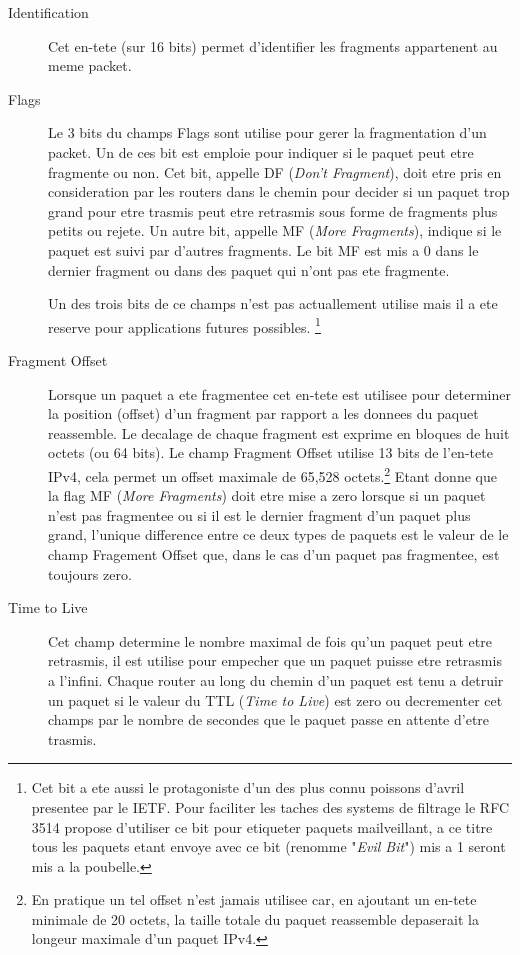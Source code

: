 \documentclass[twoside,openright,a4paper,11pt,french]{article}
\begin{document}
\begin{description}
\item [Identification]
Cet en-tete (sur 16 bits) permet d'identifier les fragments appartenent au meme packet.

\item [Flags]
Le 3 bits du champs Flags sont utilise pour gerer la fragmentation d'un packet.
Un de ces bit est emploie pour indiquer si le paquet peut etre fragmente ou
non. Cet bit, appelle DF ({\it Don't Fragment}), doit etre pris en consideration
par les routers dans le chemin pour decider si un paquet trop grand pour etre
trasmis peut etre retrasmis sous forme de fragments plus petits ou rejete. 
Un autre bit, appelle MF ({\it More Fragments}), indique si le paquet est suivi 
par d'autres fragments. Le bit MF est mis a 0 dans le dernier fragment ou dans
des paquet qui n'ont pas ete fragmente.

Un des trois bits de ce champs n'est pas actuallement utilise mais il a ete
reserve pour applications futures possibles.
\footnote {Cet bit a ete aussi le protagoniste d'un des plus connu poissons
d'avril presentee par le IETF. Pour faciliter les taches des systems de filtrage 
le RFC 3514 propose d'utiliser ce bit pour etiqueter paquets mailveillant, a ce
titre tous les paquets etant envoye avec ce bit (renomme "{\it Evil Bit}") 
mis a 1 seront mis a la poubelle.
}

\item [Fragment Offset]
Lorsque un paquet a ete fragmentee cet en-tete est utilisee pour determiner la 
position (offset) d'un fragment par rapport a les donnees du paquet reassemble.
Le decalage de chaque fragment est exprime en bloques de huit octets (ou 64
bits).  Le champ Fragment Offset utilise 13 bits de l'en-tete IPv4, cela permet
un offset maximale de 65,528 octets.\footnote {En pratique un tel offset n'est
jamais utilisee car, en ajoutant un en-tete minimale de 20 octets, la taille 
totale du paquet reassemble depaserait la longeur maximale d'un paquet IPv4.}
Etant donne que la flag MF ({\it More Fragments}) doit etre mise a zero lorsque 
si un paquet n'est pas fragmentee ou si il est le dernier fragment d'un paquet
plus grand, l'unique difference entre ce deux types de paquets est le valeur
de le champ Fragement Offset que, dans le cas d'un paquet pas fragmentee, est
toujours zero.

\item [Time to Live]
Cet champ determine le nombre maximal de fois qu'un paquet peut etre retrasmis, 
il est utilise pour empecher que un paquet puisse etre retrasmis a l'infini.
Chaque router au long du chemin d'un paquet est tenu a detruir un paquet si le
valeur du TTL ({\it Time to Live}) est zero ou decrementer cet champs par le
nombre de secondes que le paquet passe en attente d'etre trasmis.


\end{description}
\end{document}
